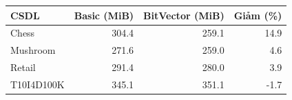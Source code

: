 \begin{tabular}{lrrr}
\toprule
CSDL & Basic (MiB) & BitVector (MiB) & Giảm (\%) \\
\midrule
Chess & 304.4 & 259.1 & 14.9 \\
Mushroom & 271.6 & 259.0 & 4.6 \\
Retail & 291.4 & 280.0 & 3.9 \\
T10I4D100K & 345.1 & 351.1 & -1.7 \\
\bottomrule
\end{tabular}
